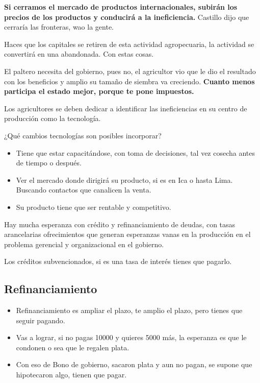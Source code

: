 \documentclass[
  a4paper,
]{article}
\begin{document}
\textbf{Si cerramos el mercado de productos internacionales, subirán los
precios de los productos y conducirá a la ineficiencia.} Castillo dijo
que cerraría las fronteras, wao la gente.

Haces que los capitales se retiren de esta actividad agropecuaria, la
actividad se convertirá en una abandonada. Con estas cosas.

El paltero necesita del gobierno, pues no, el agricultor vio que le dio
el resultado con los beneficios y amplio su tamaño de siembra va
creciendo. \textbf{Cuanto menos participa el estado mejor, porque te
pone impuestos.}

Los agricultores se deben dedicar a identificar las ineficiencias en su
centro de producción como la tecnología.

¿Qué cambios tecnologías son posibles incorporar?

\begin{itemize}
\item
  Tiene que estar capacitándose, con toma de decisiones, tal vez cosecha
  antes de tiempo o después.
\item
  Ver el mercado donde dirigirá su producto, si es en Ica o hasta Lima.
  Buscando contactos que canalicen la venta.
\item
  Su producto tiene que ser rentable y competitivo.
\end{itemize}

Hay mucha esperanza con crédito y refinanciamiento de deudas, con tasas
arancelarias ofrecimientos que generan esperanzas vanas en la producción
en el problema gerencial y organizacional en el gobierno.

Los créditos subvencionados, si es una tasa de interés tienes que
pagarlo.

\hypertarget{refinanciamiento}{%
\subsection{Refinanciamiento}\label{refinanciamiento}}

\begin{itemize}
\item
  Refinanciamiento es ampliar el plazo, te amplio el plazo, pero tienes
  que seguir pagando.
\item
  Vas a lograr, si no pagas 10000 y quieres 5000 más, la esperanza es
  que le condonen o sea que le regalen plata.
\item
  Con eso de Bono de gobierno, sacaron plata y aun no pagan, se supone
  que hipotecaron algo, tienen que pagar.
\end{itemize}
\end{document}
